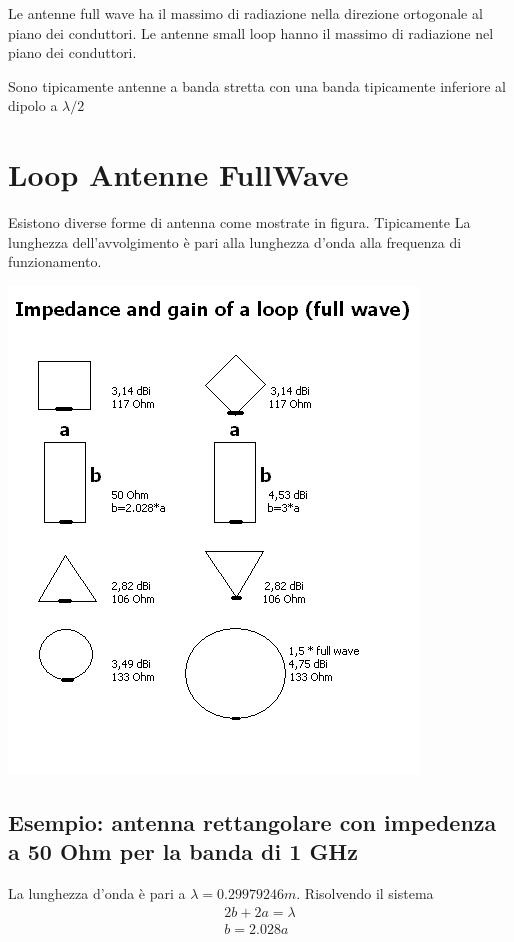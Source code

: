 \documentclass[10pt,a4paper]{book}
\begin{document}
Le antenne full wave ha il massimo di radiazione nella direzione ortogonale al piano dei conduttori. Le antenne small loop hanno il massimo di radiazione nel piano dei conduttori.

Sono tipicamente antenne a banda stretta con una banda tipicamente inferiore al dipolo a $\lambda/2$

\section{Loop Antenne FullWave}
Esistono diverse forme di antenna come mostrate in figura. Tipicamente La lunghezza dell'avvolgimento è pari alla lunghezza d'onda alla frequenza di funzionamento.
\begin{center}
\includegraphics[scale=1]{img/Antenne/Loop_and_quad.png} 
\end{center}

\subsection{Esempio: antenna rettangolare con impedenza a 50 Ohm per la banda di 1 GHz}
La lunghezza d'onda è pari a $\lambda = 0.29979246 m$. Risolvendo il sistema
\begin{eqnarray}
2 b + 2 a = \lambda \\
b = 2.028 a
\end{eqnarray}
\end{document}
